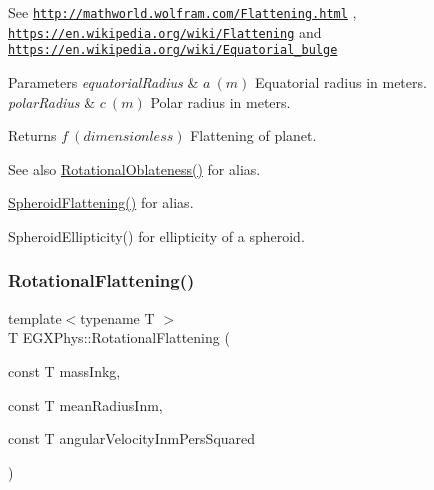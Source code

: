 See \href{http://mathworld.wolfram.com/Flattening.html}{\tt http\+://mathworld.\+wolfram.\+com/\+Flattening.\+html} , \href{https://en.wikipedia.org/wiki/Flattening}{\tt https\+://en.\+wikipedia.\+org/wiki/\+Flattening} and \href{https://en.wikipedia.org/wiki/Equatorial_bulge}{\tt https\+://en.\+wikipedia.\+org/wiki/\+Equatorial\+\_\+bulge} 
\begin{DoxyParams}{Parameters}
{\em equatorial\+Radius} & $ a\ (m)$ Equatorial radius in meters. \\
\hline
{\em polar\+Radius} & $ c\ (m)$ Polar radius in meters. \\
\hline
\end{DoxyParams}
\begin{DoxyReturn}{Returns}
$ f\ (dimensionless)$ Flattening of planet. 
\end{DoxyReturn}
\begin{DoxySeeAlso}{See also}
\mbox{\hyperlink{group___e_g_x_phys-_astrophysics-_rotational_flattening_ga7d78d01c8b3e1a9b2e4f17cb67969a88}{Rotational\+Oblateness()}} for alias. 

\mbox{\hyperlink{group___e_g_x_math-_geometry-3_d-_spheroid-_flattening_ga640f4bcd86aa4c378819bffda31c0852}{Spheroid\+Flattening()}} for alias. 

Spheroid\+Ellipticity() for ellipticity of a spheroid. 
\end{DoxySeeAlso}
\mbox{\label{group___e_g_x_phys-_astrophysics-_rotational_flattening_ga316b9afb6e1aa940fa96417c6f24ed4d}} 
\subsubsection{\texorpdfstring{Rotational\+Flattening()}{RotationalFlattening()}\hspace{0.1cm}{\footnotesize\ttfamily [3/3]}}
{\footnotesize\ttfamily template$<$typename T $>$ \\
T E\+G\+X\+Phys\+::\+Rotational\+Flattening (\begin{DoxyParamCaption}\item[{const T}]{mass\+Inkg,  }\item[{const T}]{mean\+Radius\+Inm,  }\item[{const T}]{angular\+Velocity\+Inm\+Pers\+Squared }\end{DoxyParamCaption})}



